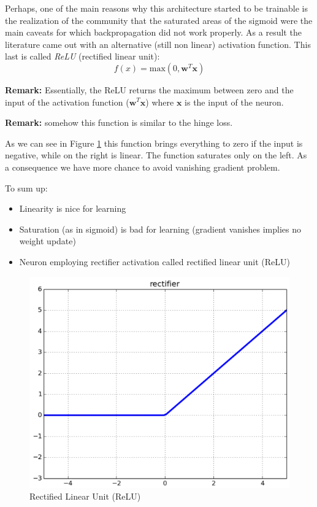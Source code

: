 Perhaps, one of the main reasons why this architecture started to be trainable is the realization of the community that the saturated areas of the sigmoid were the main caveats for which backpropagation did not work properly. As a result the literature came out with an alternative (still non linear) activation function. This last is called \textit{ReLU} (rectified linear unit):
\begin{equation}
    f(x) = \text{max}(0, \pmb{w}^T \pmb{x})
\end{equation}

\textbf{Remark:} Essentially, the ReLU returns the maximum between zero and the input of the activation function ($\pmb{w}^T \pmb{x}$) where $\pmb{x}$ is the input of the neuron. \newline

\textbf{Remark:} somehow this function is similar to the hinge loss. \newline

As we can see in Figure \ref{fig:relu} this function brings everything to zero if the input is negative, while on the right is linear. The function saturates only on the left. As a consequence we have more chance to avoid vanishing gradient problem. \newline

To sum up:
\begin{itemize}
    \item Linearity is nice for learning
    \item Saturation (as in sigmoid) is bad for learning (gradient vanishes implies no weight update)
    \item Neuron employing rectifier activation called rectified linear unit (ReLU)
\end{itemize}

\begin{figure}
    \centering
    \includegraphics[scale=0.5]{images/relu.png}
    \caption{Rectified Linear Unit (ReLU)}
    \label{fig:relu}
\end{figure}

